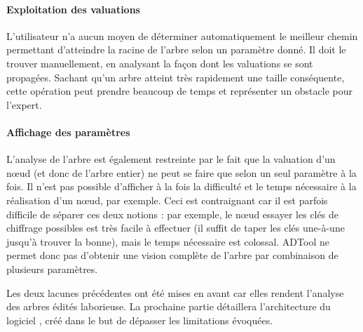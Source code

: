 	\paragraph{Exploitation des valuations} L'utilisateur n'a aucun moyen de déterminer automatiquement le \og meilleur chemin \fg{} permettant d'atteindre la racine de l'arbre selon un paramètre donné. Il doit le trouver manuellement, en analysant la façon dont les valuations se sont propagées. Sachant qu'un arbre atteint très rapidement une taille conséquente, cette opération peut prendre beaucoup de temps et représenter un obstacle pour l'expert.

	\paragraph{Affichage des paramètres} L'analyse de l'arbre est également restreinte par le fait que la valuation d'un nœud (et donc de l'arbre entier) ne peut se faire que selon un seul paramètre à la fois. Il n'est pas possible d'afficher à la fois la \og difficulté \fg{} et le \og temps nécessaire \fg{} à la réalisation d'un nœud, par exemple. Ceci est contraignant car il est parfois difficile de séparer ces deux notions : par exemple, le nœud \og essayer les clés de chiffrage possibles \fg{} est très facile à effectuer (il suffit de taper les clés une-à-une jusqu'à trouver la bonne), mais le temps nécessaire est colossal. ADTool ne permet donc pas d'obtenir une vision complète de l'arbre par combinaison de plusieurs paramètres.

	Les deux lacunes précédentes ont été mises en avant car elles rendent l'analyse des arbres édités laborieuse. La prochaine partie détaillera l'architecture du logiciel \glasir{}, créé dans le but de dépasser les limitations évoquées.